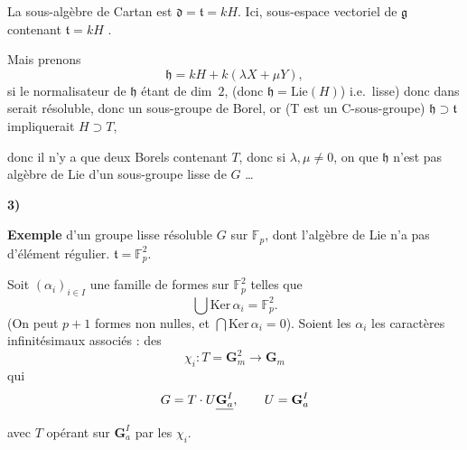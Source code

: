 \documentclass[11pt,a4paper]{article}
\begin{document}


La sous-algèbre de Cartan est $\mathfrak{d} = \mathfrak{t} = kH$.
Ici,  sous-espace  vectoriel de
$\mathfrak{g}$ contenant $\mathfrak{t} = kH$ \struck{\ill{} \ill{} \ill{}}
. 

Mais prenons
\[
  \mathfrak{h} = kH + k(\lambda X + \mu Y),
\]
si  \struck{\ill{}} le normalisateur
 de $\mathfrak{h}$ étant de dim~$2$, (donc $\mathfrak{h} =
\mathrm{Lie}(H)$)  i.e.\ lisse) donc dans
 \struck{\ill{} \ill{}
\ill{}} serait résoluble, donc un \struck{\ill{} \ill{}} 
sous-groupe de Borel, or  (T est un
C-sous-groupe)
\struck{\ill{}} $\mathfrak{h} \supset \mathfrak{t}$   impliquerait $H \supset T$,

donc \ill{} il n'y a que deux Borels contenant $T$, \struck{\ill{}} donc
si $\lambda, \mu \neq 0$, on  que $\mathfrak{h}$ n'est pas
algèbre de Lie d'un sous-groupe lisse de $G$ …

\textbf{3)}


\textbf{Exemple} d'un groupe lisse résoluble 
$G$ sur $\mathbb{F}_p$, \add{\ill{} \ill{} \ill{}} dont l'algèbre de Lie n'a pas d'élément
régulier. \qquad $\mathfrak{t} = \mathbb{F}_p^2$.

Soit $(\alpha_i)_{i \in I}$ une famille  de formes
 sur \struck{\ill{}} $\mathbb{F}_p^2$ telles
que
\[
  \bigcup \mathrm{Ker}\, \alpha_i = \mathbb{F}_p^2 .
\]
(On peut \ill{} \ill{} \ill{} $p+1$ formes non nulles, et $\bigcap
\mathrm{Ker}\, \alpha_i = 0$). Soient les $\alpha_i$ \ill{} les
caractères infinitésimaux associés : des 
\[
  \chi_i : T = \mathbf{G}_m^2 \longrightarrow \mathbf{G}_m
\]
qui \ill{} \ill{} \ill{} \ill{} \ill{} \ill{}
\[
  G = T \cdot U \struck{\mathbf{G}_a^{I}}, \qquad U = \mathbf{G}_a^{I}
\]
avec $T$ opérant sur $\mathbf{G}_a^{I}$ par les $\chi_i$.
\end{document}
